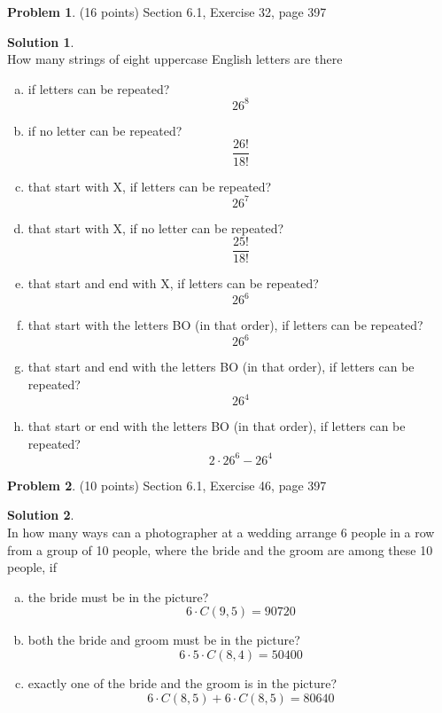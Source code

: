 \documentclass{article}
\theoremstyle{definition}
\newtheorem{problem}{Problem}
\newtheorem*{solution}{Solution}
\begin{document}
\begin{problem} (16 points) 
Section 6.1, Exercise 32, page 397
\end{problem}
\begin{solution} \ \\
How many strings of eight uppercase English letters are
there
\begin{enumerate}[a)]
  \item if letters can be repeated?
  $$26^8$$
  \item if no letter can be repeated?
  $$\dfrac{26!}{18!}$$
  \item that start with X, if letters can be repeated?
  $$26^7$$
  \item that start with X, if no letter can be repeated?
  $$ \dfrac{25!}{18!}$$
  \item that start and end with X, if letters can be repeated?
  $$26^6$$
  \item that start with the letters BO (in that order), if letters can be repeated?
  $$26^6$$
  \item that start and end with the letters BO (in that order), if letters can be repeated?
  $$26^4$$
  \item that start or end with the letters BO (in that order), if letters can be repeated?
  $$2\cdot 26^6 - 26^4$$
\end{enumerate}
\end{solution}

\begin{problem} (10 points) 
Section 6.1, Exercise 46, page 397
\end{problem}
\begin{solution} \ \\
In how many ways can a photographer at a wedding arrange 6 people in a row from a group of 10 people, where
the bride and the groom are among these 10 people, if
\begin{enumerate}[a)]
  \item the bride must be in the picture?
  $$6 \cdot C(9,5) = 90720$$
  \item both the bride and groom must be in the picture?
  $$6 \cdot 5 \cdot C(8,4) = 50400$$
  \item exactly one of the bride and the groom is in the picture?
  $$6 \cdot C(8,5) + 6 \cdot C(8,5) = 80640$$
\end{enumerate}
\end{solution}
\end{document}
